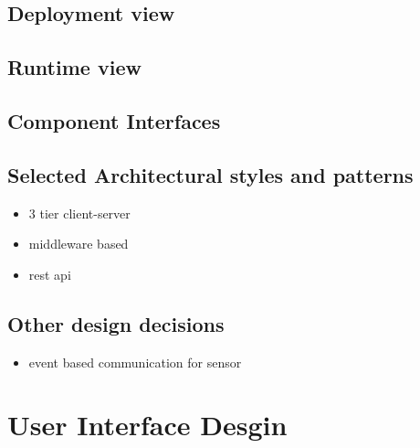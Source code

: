 \documentclass[10pt]{article} %
\begin{document}
\subsection{Deployment view}
\subsection{Runtime view}
\subsection{Component Interfaces}
\subsection{Selected Architectural styles and patterns}
\begin{itemize}
    \item 3 tier client-server
    \item middleware based
    \item rest api  
\end{itemize}
\subsection{Other design decisions}
\begin{itemize}
    \item event based communication for sensor
\end{itemize}
\section{User Interface Desgin}
\end{document}
